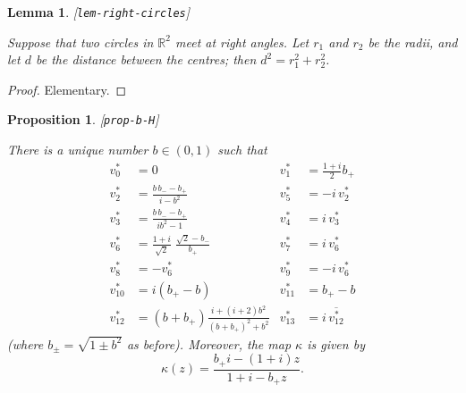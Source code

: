 \documentclass[reqno]{amsart}
\newcommand{\lbl}[1]{\label{#1}\textup{[\texttt{#1}]}\par}
\newcommand{\lbl}{\label}
\newcommand{\kp}        {\kappa}
\newcommand{\R}         {{\mathbb{R}}}
\newcommand{\ov}[1]     {\overline{#1}}
\newcommand{\rt}        {\sqrt{2}}
\renewcommand{\:}{\colon}
\newtheorem{lemma}[theorem]{Lemma}
\newtheorem{proposition}[theorem]{Proposition}
\theoremstyle{definition}
\begin{document}
\begin{lemma}\lbl{lem-right-circles}
 Suppose that two circles in $\R^2$ meet at right angles.  Let $r_1$
 and $r_2$ be the radii, and let $d$ be the distance between the
 centres; then $d^2=r_1^2+r_2^2$.
\end{lemma}
\begin{proof}
 Elementary.
\end{proof}

\begin{proposition}\lbl{prop-b-H}
 There is a unique number $b\in(0,1)$ such that
 \begin{align*}
  v^*_0 &= 0 &
  v^*_1 &= \frac{1+i}{2}b_+ \\
  v^*_2 &= \frac{b\,b_--b_+}{i-b^2} &
  v^*_5 &= -i \, v^*_2 \\
  v^*_3 &= \frac{b\,b_--b_+}{ib^2-1} &
  v^*_4 &= i \, v^*_3 \\
  v^*_6 &= \frac{1+i}{\rt}\;\frac{\rt-b_-}{b_+} &
  v^*_7 &= i \, v^*_6 \\
  v^*_8 &= -v^*_6 &
  v^*_9 &= -i\, v^*_6 \\
  v^*_{10} &= i(b_+-b) &
  v^*_{11} &= b_+-b \\
  v^*_{12} &= (b+b_+)\frac{i+(i+2)b^2}{(b+b_+)^2+b^2} &
  v^*_{13} &= i\,\ov{v^*_{12}}
 \end{align*}
 (where $b_{\pm}=\sqrt{1\pm b^2}$ as before).  Moreover, the map $\kp$
 is given by
 \[ \kp(z) = \frac{b_+i - (1+i)z}{1+i - b_+z}. \]
\end{proposition}
\end{document}
